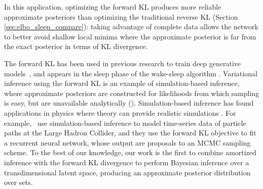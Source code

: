 In this application, optimizing the forward KL produces more reliable approximate
posteriors than optimizing the traditional reverse KL (Section \ref{sec:elbo_sleep_compare}):
taking advantage of complete data allows the network to better avoid shallow local minima
where the approximate posterior is far from the exact posterior in terms of KL divergence.




The forward KL has been used in previous research to train deep generative
models~\citep{ambrogioni2019favi,le2020revisiting},
and appears in the sleep phase of the wake-sleep algorithm
\citep{Hinton1995wake_sleep, bornschein2014reweighted,le2020revisiting}. 
Variational inference using the forward KL is an example of simulation-based inference, 
where approximate posteriors are constructed for
likelihoods from which sampling is easy, but are unavailable analytically (\citep{papamakarios2016,greenberg2019}). 
Simulation-based inference has found applications in physics where theory can provide realistic simulations \citep{Cranmer_2020}.
For example,~\cite{Baydin2019} use simulation-based inference to model
time-series data of particle paths at the Large Hadron Collider, 
and they use the forward KL objective to fit a recurrent neural network, 
whose output are proposals to an MCMC sampling scheme. 
To the best of our knowledge, our work is the first to combine amortized inference 
with the forward KL divergence to perform Bayesian inference over a transdimensional 
latent space, 
producing an approximate posterior distribution over sets. 



